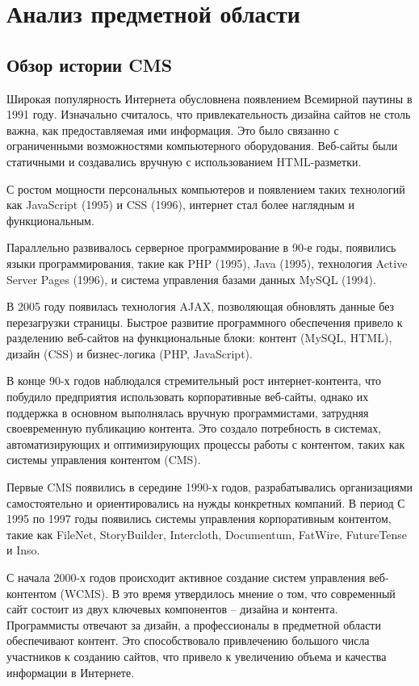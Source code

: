 \section{Анализ предметной области}
\subsection{Обзор истории CMS}

Широкая популярность Интернета обусловнена появлением Всемирной паутины в 1991 году. Изначально считалось, что привлекательность дизайна сайтов не столь важна, как предоставляемая ими информация. Это было связанно с ограниченными возможностями компьютерного оборудования. Веб-сайты были статичными и создавались вручную с использованием HTML-разметки.

С ростом мощности персональных компьютеров и появлением таких технологий как JavaScript (1995) и CSS (1996), интернет стал более наглядным и функциональным.

Параллельно развивалось серверное программирование в 90-е годы, появились языки программирования, такие как PHP (1995), Java (1995), технология Active Server Pages (1996), и система управления базами данных MySQL (1994).

В 2005 году появилась технология AJAX, позволяющая обновлять данные без перезагрузки страницы. Быстрое развитие программного обеспечения привело к разделению веб-сайтов на функциональные блоки: контент (MySQL, HTML), дизайн (CSS) и бизнес-логика (PHP, JavaScript).

В конце 90-х годов наблюдался стремительный рост интернет-контента, что побудило предприятия использовать корпоративные веб-сайты, однако их поддержка в основном выполнялась вручную программистами, затрудняя своевременную публикацию контента. Это создало потребность в системах, автоматизирующих и оптимизирующих процессы работы с контентом, таких как системы управления контентом (CMS).

Первые CMS появились в середине 1990-х годов, разрабатывались организациями самостоятельно и ориентировались на нужды конкретных компаний. В период С 1995 по 1997 годы появились системы управления корпоративным контентом, такие как FileNet, StoryBuilder, Intercloth, Documentum, FatWire, FutureTense и Inso.

С начала 2000-х годов происходит активное создание систем управления веб-контентом (WCMS). В это время утвердилось мнение о том, что современный сайт состоит из двух ключевых компонентов – дизайна и контента. Программисты отвечают за дизайн, а профессионалы в предметной области обеспечивают контент. Это способствовало привлечению большого числа участников к созданию сайтов, что привело к увеличению объема и качества информации в Интернете.

